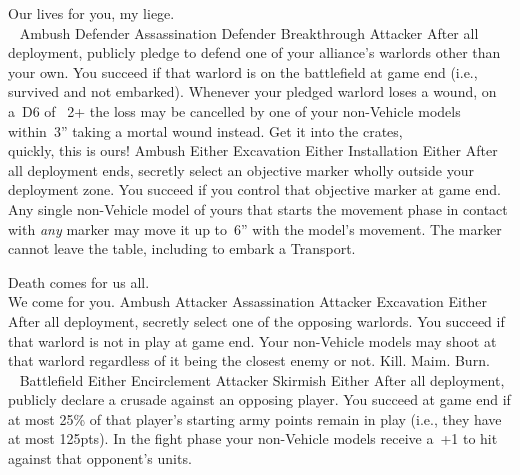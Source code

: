 \clearpage
\thispagestyle{empty}
\squelchbackground

\noindent%
%
{Our lives for you, my liege.\\~}%
{Ambush}%
{Defender}%
{Assassination}%
{Defender}%
{Breakthrough}%
{Attacker}%
{After all deployment, publicly pledge to defend one of your alliance's
  warlords other than your own.  You succeed if that warlord is on the battlefield at game end (i.e., survived and not embarked).}%
{Whenever your pledged warlord
loses a wound, on a~D6 of ~2+ the loss may be cancelled by one of your non-Vehicle
models within~3'' taking a mortal wound instead.}
\hfill
%
{Get it into the crates,\\quickly, this is ours!}%
{Ambush}%
{Either}%
{Excavation}%
{Either}%
{Installation}%
{Either}%
{After all deployment ends, secretly select an objective marker wholly
  outside your deployment zone.  You succeed if you control that objective marker at game
  end.}%
{Any single non-Vehicle model of yours that starts the movement
  phase in contact with \emph{any} marker may move it up to~6'' with
  the model's movement.  The marker cannot leave the table, including to embark a Transport.}


\noindent%
%
{Death comes for us all.\\We come for you.}%
{Ambush}%
{Attacker}%
{Assassination}%
{Attacker}%
{Excavation}%
{Either}%
{After all deployment, secretly select one of the opposing warlords.
  You succeed if that warlord is not in play at game end.}%
{Your non-Vehicle models may shoot at that warlord regardless of
it being the closest enemy or not.}
\hfill
%
{Kill.  Maim.  Burn.\\~}%
{Battlefield}%
{Either}%
{Encirclement}%
{Attacker}%
{Skirmish}%
{Either}%
{After all deployment, publicly declare a crusade against an opposing
  player.  You succeed at game end if at most 25\% of that player's
  starting army points remain in play (i.e., they have at most 125pts).}%
{In the fight phase your non-Vehicle models receive a~+1 to hit against that opponent's units.}

\pagebreak
\thispagestyle{empty}

